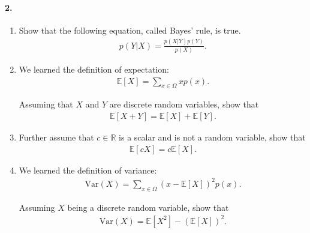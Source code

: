 \documentclass{article}
\newcommand{\RR}[0]{\mathbb{R}}
\newcommand{\E}[0]{\mathbb{E}}
\begin{document}
\vspace{30mm}

\paragraph{2.}

\begin{enumerate}[label=(\alph*)]

\item Show that the following equation, called Bayes' rule, is true.
\begin{align*}
    p(Y|X) = \frac{p(X|Y)p(Y)}{p(X)}.
\end{align*}

\vspace{15mm}

\item We learned the definition of expectation:
\begin{align*}
    \E\left[ X \right] = \sum_{x \in \Omega} x p(x). 
\end{align*}

Assuming that $X$ and $Y$ are discrete random variables, show that
\begin{align*}
    \E\left[ X + Y \right] = \E\left[X\right] + \E\left[Y \right].
\end{align*}

\vspace{15mm}

\item Further assume that $c \in \RR$ is a scalar and is not a random variable, show
that
\begin{align*}
    \E\left[ cX \right] = c\E\left[X\right].
\end{align*}

\vspace{15mm}

\item We learned the definition of variance:
\begin{align*}
    \text{Var}(X) = \sum_{x \in \Omega} (x - \E\left[ X \right])^2 p(x).
\end{align*}

Assuming $X$ being a discrete random variable, show that
\begin{align*}
    \text{Var}(X) = \E\left[ X^2 \right] - \left(\E\left[ X \right]\right)^2.
\end{align*}

\end{enumerate}

\newpage
\end{document}
